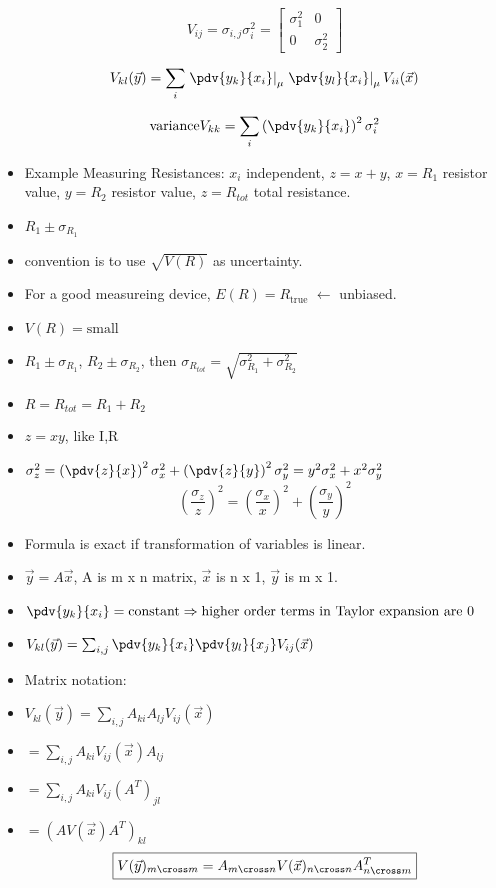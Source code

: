 \begin{itemize}
    \[ V_{ij} = \sigma_{i,j} \sigma_{i}^2 = \begin{bmatrix}
        \sigma_1^2 & 0 \\
        0 & \sigma_2^2
    \end{bmatrix} \] 

    \[ V_{kl}(\vec{y}) = \sum_i \left. \pdv{y_k}{x_i}\right|_{\mu}  \left. \pdv{y_l}{x_i} \right|_{\mu} V_{ii}(\vec{x}) \]
    

    \[ \text{variance} V_{kk} = \sum_i \left(\pdv{y_k}{x_i} \right)^2 \sigma_i^2 \]

    \item Example Measuring Resistances: $x_i$ independent, $z = x+y$, $x=R_1$ resistor value, $y=R_2$ resistor value, $z=R_{tot}$ total resistance.
    \item $R_1 \pm \sigma_{R_1}$
    \item convention is to use $\sqrt{V(R)}$ as uncertainty.
    \item For a good measureing device, $E(R) = R_{\text{true}}$ $\leftarrow$ unbiased.
    \item $V(R) = \text{small}$
    \item $R_1 \pm \sigma_{R_1}$, $R_2 \pm \sigma_{R_2}$, then $\sigma_{R_{tot}} = \sqrt{\sigma_{R_1}^2 + \sigma_{R_2}^2}$
    \item $R=R_{tot} = R_1 + R_2$
    \item $z = x y$, like I,R
    \item $\sigma_z^2 = \left(\pdv{z}{x} \right)^2 \sigma_x^2 + \left(\pdv{z}{y} \right)^2 \sigma_y^2 = y^2 \sigma_x^2 + x^2 \sigma_y^2$
    \[ \boxed{ \left(\frac{\sigma_z}{z} \right)^2 = \left(\frac{\sigma_x}{x} \right)^2 + \left(\frac{\sigma_y}{y} \right)^2 } \]
    \item Formula is exact if transformation of variables is linear.
    \item $\vec{y} = A \vec{x}$, A is m x n matrix, $\vec{x}$ is n x 1, $\vec{y}$ is m x 1.
    \item $\pdv{y_k}{x_i} = \text{constant} \Rightarrow \text{higher order terms in Taylor expansion are 0}$
    \item $V_{kl}(\vec{y}) = \sum_{i,j} \pdv{y_k}{x_i} \pdv{y_l}{x_j} V_{ij}(\vec{x})$
    \item Matrix notation:
    \item $V_{kl}(\vec{y})  = \sum_{i,j} A_{ki} A_{lj} V_{ij}(\vec{x})$
    \item $ = \sum_{i,j} A_{ki} V_{ij}(\vec{x}) A_{lj}$
    \item $ = \sum_{i,j} A_{ki} V_{ij} (A^T)_{jl}$
    \item $ = (A V(\vec{x}) A^T)_{kl}$
    \[ \boxed{ V(\vec{y})_{m \cross m} = A_{m \cross n} V(\vec{x})_{n \cross n} A^T_{n \cross m} } \]


\end{itemize}
